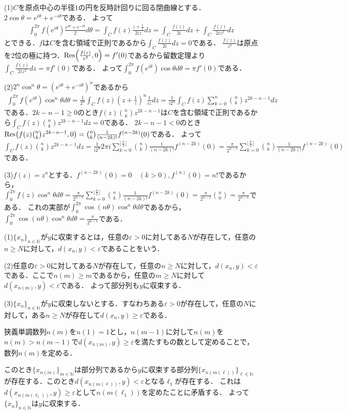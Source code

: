 \documentclass[
		book,
		head_space=20mm,
		foot_space=20mm,
		gutter=10mm,
		line_length=190mm
]{jlreq}
\begin{document}
(1)$C$を原点中心の半径$1$の円を反時計回りに回る閉曲線とする．
$2\cos \theta=e^{i\theta}+e^{-i\theta}$である．
よって \begin{align}
	\int_0^{2\pi}f(e^{i\theta})\frac{e^{i\theta}+e^{-i\theta}}{2}d\theta=\int_C f(z)\frac{z+\frac{1}{z}}{2iz}dz=\int_C \frac{f(z)}{2i}dz+\int_C \frac{f(z)}{2iz^2}dz
\end{align}とできる．$f$は$C$を含む領域で正則であるから$\int_C \frac{f(z)}{2i}dz=0$である．
$\frac{f(z)}{z^2}$は原点を2位の極に持つ．$\Res(\frac{f(z)}{z^2},0)=f'(0)$であるから留数定理より$\int_C \frac{f(z)}{2iz^2}dz=\pi f'(0)$である．
よって$\int_0^{2\pi}f(e^{i\theta})\cos \theta d\theta=\pi f'(0)$である．

(2)$2^n\cos^n \theta=(e^{i\theta}+e^{-i\theta})^n$であるから 
\begin{align}
	\int_0^{2\pi}f(e^{i\theta})\cos^n \theta d\theta=\frac{1}{2^n}\int_C f(z)(z+\frac{1}{z})^n\frac{1}{iz}dz=\frac{1}{i2^n}\int_C f(z)\sum_{k=0}^n \binom{n}{k}z^{2k-n-1}dz
\end{align}
である．$2k-n-1\ge 0$のとき$f(z) \binom{n}{k}z^{2k-n-1}$は$C$を含む領域で正則であるから$\int_C f(z) \binom{n}{k}z^{2k-n-1}dz=0$である．
$2k-n-1<0$のとき$\Res(f(z) \binom{n}{k}z^{2k-n-1},0)=\binom{n}{k}\frac{1}{(n-2k)!}f^{(n-2k)}(0)$である．
よって$\int_C f(z) \binom{n}{k}z^{2k-n-1}dz=\frac{1}{i2^n}2\pi i\sum\limits_{k=0}^{\lfloor\frac{n}{2}\rfloor}\binom{n}{k}\frac{1}{(n-2k)!}f^{(n-2k)}(0)=\frac{\pi}{2^{n-1}}\sum\limits_{k=0}^{\lfloor\frac{n}{2}\rfloor}\binom{n}{k}\frac{1}{(n-2k)!}f^{(n-2k)}(0)$である．

(3)$f(z)=z^n$とする．$f^{(n-2k)}(0)=0\quad(k>0),f^{(n)}(0)=n!$であるから，
$\int_0^{2\pi}f(z)\cos^n \theta d\theta=\frac{\pi}{2^{n-1}}\sum\limits_{k=0}^{\lfloor\frac{n}{2}\rfloor}\binom{n}{k}\frac{1}{(n-2k)!}f^{(n-2k)}(0)=\frac{\pi}{2^{n-1}}\binom{n}{0}=\frac{\pi}{2^{n-1}}$である．
これの実部が$\int_0^{2\pi}\cos(n\theta)\cos^n \theta d\theta$であるから，
$\int_0^{2\pi}\cos(n\theta)\cos^n \theta d\theta=\frac{\pi}{2^{n-1}}$である．

(1)$\{ x_n\}_{n\in \mathbb{N}}$が$y$に収束するとは，任意の$\varepsilon>0$に対してある$N$が存在して，任意の$n\ge N$に対して，$d(x_n,y)<\varepsilon$であることをいう．

(2)任意の$\varepsilon>0$に対してある$N$が存在して，任意の$n\ge N$に対して，$d(x_n,y)<\varepsilon$である．ここで$n(m)\ge m$であるから，任意の$m\ge N$に対して$d(x_{n(m)},y)<\varepsilon$である．
よって部分列も$y$に収束する．

(3)$\{x_n\}_{n\in \mathbb{N}}$が$y$に収束しないとする．すなわちある$\varepsilon>0$が存在して，任意の$N$に対して，ある$n\ge N$が存在して$d(x_n,y)\ge\varepsilon$である．

狭義単調数列$n(m)$を$n(1)=1$とし，$n(m-1)$に対して$n(m)$を$n(m)> n(m-1)$で$d(x_{n(m)},y)\ge \varepsilon$を満たすもの数として定めることで，数列$n(m)$を定める．

このとき$\{x_{n(m)}\}_{m\in \mathbb{N}}$は部分列であるから$y$に収束する部分列$\{x_{n(m(\ell))}\}_{\ell\in \mathbb{N}}$が存在する．このとき$d(x_{n(m(\ell))},y)<\varepsilon$となる$\ell_1$が存在する．
これは$d(x_{n(m(\ell_1))},y)\ge \varepsilon$として$n(m(\ell_1))$を定めたことに矛盾する．
よって$\{x_n\}_{n\in \mathbb{N}}$は$y$に収束する．
\end{document}
